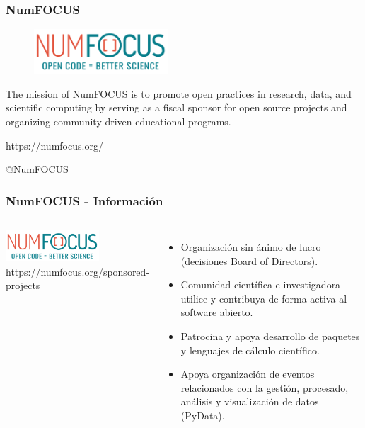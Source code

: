 \documentclass[18pt]{beamer}
\begin{document}
\begin{frame}

	\frametitle{NumFOCUS}
	
	\begin{figure}
		\includegraphics[width=5cm]{images/numfocus.png}
	\end{figure}
	
	The mission of NumFOCUS is to promote open practices in research, data, 
	and scientific computing by serving as a fiscal sponsor for open source 
	projects and organizing community-driven educational programs.
	

	\vspace{0.6cm}    
	\centerline{https://numfocus.org/}
	
	\vspace{0.4cm}
	\centerline{@NumFOCUS}
	
\end{frame}


\begin{frame}

	\frametitle{NumFOCUS - Información}
		
	\begin{columns}
		\centering
			\includegraphics[width=3.5cm]{images/numfocus.png}\\
			\vspace{0.5cm}			
			\scriptsize https://numfocus.org/sponsored-projects
		\begin{itemize}
			\setlength\itemsep{0.6em}		
			\item Organización sin ánimo de lucro (decisiones Board of Directors).
			\item Comunidad científica e investigadora utilice y contribuya de forma
			activa al software abierto. 
			\item Patrocina y apoya desarrollo de paquetes y lenguajes de cálculo científico.
			\item Apoya organización de eventos relacionados con la gestión, procesado, 
			análisis y visualización de datos (PyData). 
		\end{itemize}
	\end{columns}
	
\end{frame}
\end{document}
